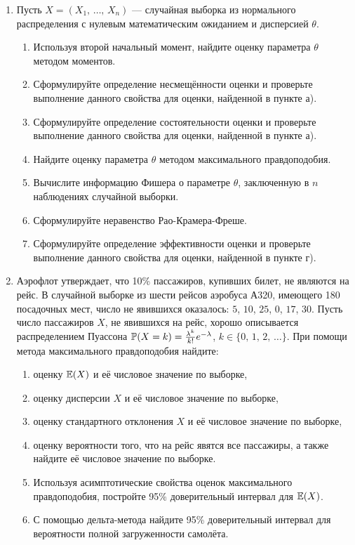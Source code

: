 \begin{enumerate}
\item
Пусть $X = (X_1, \, \ldots, \, X_n)$ — случайная выборка из нормального распределения
с нулевым математическим ожиданием и дисперсией $\theta$.
\begin{enumerate}
  \item Используя второй начальный момент, найдите оценку параметра $\theta$
	методом моментов.
  \item Сформулируйте определение несмещённости оценки и проверьте выполнение
	данного свойства для оценки, найденной в пункте а).
  \item Сформулируйте определение состоятельности оценки и проверьте выполнение
	данного свойства для оценки, найденной в пункте а).
  \item Найдите оценку параметра $\theta$ методом максимального правдоподобия.
  \item Вычислите информацию Фишера о параметре $\theta$, заключенную в $n$
	наблюдениях случайной выборки.
  \item Сформулируйте неравенство Рао-Крамера-Фреше.
  \item Сформулируйте определение эффективности оценки и проверьте выполнение
	данного свойства для оценки, найденной в пункте г).
\end{enumerate}

\item
Аэрофлот утверждает, что 10\% пассажиров, купивших билет, не являются на рейс.
В случайной выборке из шести рейсов аэробуса А320, имеющего 180 посадочных мест,
число не явившихся оказалось: $5$, $10$, $25$, $0$, $17$, $30$. Пусть число пассажиров
$X$, не явившихся на рейс, хорошо описывается распределением Пуассона $\P(X = k)
= \tfrac{\lambda^{k}}{k!}e^{-\lambda}$, $k \in \{0,\, 1,\, 2,\, \ldots\}$. При
помощи метода максимального правдоподобия найдите:
\begin{enumerate}
  \item оценку $\E(X)$ и её числовое значение по выборке,
  \item оценку дисперсии $X$ и её числовое значение по выборке,
  \item оценку стандартного отклонения $X$ и её числовое значение по выборке,
  \item оценку вероятности того, что на рейс явятся все пассажиры, а также найдите
	её числовое значение по выборке.
  \item Используя асимптотические свойства оценок максимального правдоподобия,
	постройте 95\% доверительный интервал для $\E(X)$.
  \item С помощью дельта-метода найдите 95\% доверительный интервал для вероятности
	полной загруженности самолёта.
\end{enumerate}
\end{enumerate}


